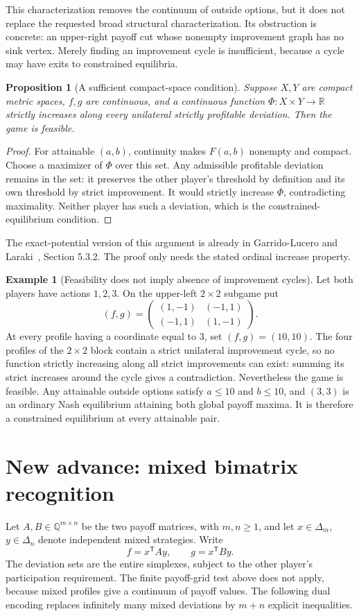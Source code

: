 \documentclass[11pt]{article}
\newtheorem{proposition}{Proposition}
\theoremstyle{definition}
\newtheorem{example}{Example}
\theoremstyle{remark}
\begin{document}
This characterization removes the continuum of outside options, but it does not replace the requested broad structural characterization. Its obstruction is concrete: an upper-right payoff cut whose nonempty improvement graph has no sink vertex. Merely finding an improvement cycle is insufficient, because a cycle may have exits to constrained equilibria.

\begin{proposition}[A sufficient compact-space condition]
Suppose $X,Y$ are compact metric spaces, $f,g$ are continuous, and a continuous function $\Phi:X\times Y\to\mathbb R$ strictly increases along every unilateral strictly profitable deviation. Then the game is feasible.
\end{proposition}
\begin{proof}
For attainable $(a,b)$, continuity makes $F(a,b)$ nonempty and compact. Choose a maximizer of $\Phi$ over this set. Any admissible profitable deviation remains in the set: it preserves the other player's threshold by definition and its own threshold by strict improvement. It would strictly increase $\Phi$, contradicting maximality. Neither player has such a deviation, which is the constrained-equilibrium condition.
\end{proof}

The exact-potential version of this argument is already in Garrido-Lucero and Laraki~\cite{source}, Section 5.3.2. The proof only needs the stated ordinal increase property.

\begin{example}[Feasibility does not imply absence of improvement cycles]
Let both players have actions $1,2,3$. On the upper-left $2\times2$ subgame put
\[
 (f,g)=\begin{pmatrix}(1,-1)&(-1,1)\\(-1,1)&(1,-1)\end{pmatrix}.
\]
At every profile having a coordinate equal to $3$, set $(f,g)=(10,10)$. The four profiles of the $2\times2$ block contain a strict unilateral improvement cycle, so no function strictly increasing along all strict improvements can exist: summing its strict increases around the cycle gives a contradiction. Nevertheless the game is feasible. Any attainable outside options satisfy $a\leq10$ and $b\leq10$, and $(3,3)$ is an ordinary Nash equilibrium attaining both global payoff maxima. It is therefore a constrained equilibrium at every attainable pair.
\end{example}

\section{New advance: mixed bimatrix recognition}
Let $A,B\in\mathbb Q^{m\times n}$ be the two payoff matrices, with
$m,n\geq1$, and let $x\in\Delta_m$, $y\in\Delta_n$ denote independent
mixed strategies. Write
\[
 f=x^{\mathsf T}Ay,\qquad g=x^{\mathsf T}By.
\]
The deviation sets are the entire simplexes, subject to the other player's
participation requirement. The finite payoff-grid test above does not
apply, because mixed profiles give a continuum of payoff values. The
following dual encoding replaces infinitely many mixed deviations by
$m+n$ explicit inequalities.
\end{document}
